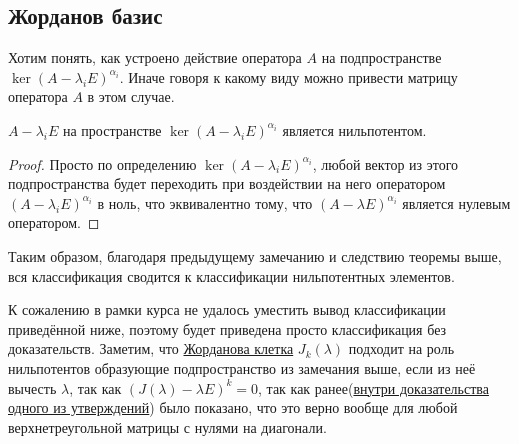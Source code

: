 \subsection{Жорданов базис}
\begin{motivation}
    Хотим понять, как устроено действие оператора $A$ на подпространстве $\ker (A - \lambda_iE)^{\alpha_i}$.
    Иначе говоря к какому виду можно привести матрицу оператора $A$ в этом случае.
\end{motivation}
\begin{remark}
    $A - \lambda_iE$ на пространстве $\ker(A - \lambda_iE)^{\alpha_i}$ является нильпотентом.
\end{remark}
\begin{proof}
    Просто по определению $\ker (A - \lambda_i E)^{\alpha_i}$, любой вектор из этого
    подпространства будет переходить при воздействии на него оператором 
    $(A - \lambda_i E)^{\alpha_i}$ в ноль, что эквивалентно тому, что 
    $(A - \lambda E)^{\alpha_i}$ является нулевым оператором.
\end{proof}
\begin{follow}
    Таким образом, благодаря предыдущему замечанию и следствию теоремы выше,
    вся классификация сводится к классификации нильпотентных элементов.
\end{follow}

К сожалению в рамки курса не удалось уместить вывод классификации приведённой ниже,
поэтому будет приведена просто классификация без доказательств.
Заметим, что \hyperref[def:жорданова клетка]{Жорданова клетка} $J_k(\lambda)$ 
подходит на роль нильпотентов образующие подпространство из замечания выше,
если из неё вычесть $\lambda$, так как $(J(\lambda) - \lambda E)^k = 0$, так как
ранее(\hyperref[fix:nilpotent]{внутри доказательства одного из утверждений})
было показано, что это верно вообще для любой верхнетреугольной матрицы с нулями
на диагонали.

